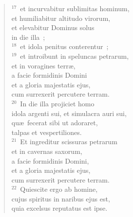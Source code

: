\begin{flushleft}
\begin{verse}
${}^{17}$~et incurvabitur sublimitas hominum,\\ et humiliabitur altitudo virorum,\\ et elevabitur Dominus solus\\ in die illa~;\\
${}^{18}$~et idola penitus conterentur~;\\
${}^{19}$~et introibunt in speluncas petrarum,\\ et in voragines terr\ae ,\\ a facie formidinis Domini\\ et a gloria majestatis ejus,\\ cum surrexerit percutere terram.\\
${}^{20}$~In die illa projiciet homo\\ idola argenti sui, et simulacra auri sui,\\ qu\ae\ fecerat sibi ut adoraret,\\ talpas et vespertiliones.\\
${}^{21}$~Et ingreditur scissuras petrarum\\ et in cavernas saxorum,\\ a facie formidinis Domini,\\ et a gloria majestatis ejus,\\ cum surrexerit percutere terram.\\
${}^{22}$~Quiescite ergo ab homine,\\ cujus spiritus in naribus ejus est,\\ quia excelsus reputatus est ipse.\end{verse}\end{flushleft}


